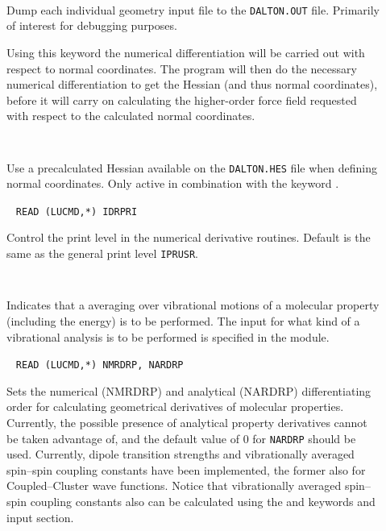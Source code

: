 \begin{description}
\item[]\verb| |\newline

Dump each individual geometry input file to the \verb|DALTON.OUT|
file. Primarily of interest for debugging purposes.

\item[]
Using this keyword the numerical differentiation will be carried out
with respect to normal coordinates. The program will then do the
necessary numerical differentiation to get the Hessian (and thus
normal coordinates), before it will carry on calculating the
higher-order force field requested with respect to the calculated normal
coordinates.

\item[]\verb| |\newline

Use a precalculated Hessian available on the \verb|DALTON.HES| file
when defining normal coordinates. Only active in combination with the
keyword .

\item[]\verb| |\newline
\verb|READ (LUCMD,*) IDRPRI|

Control the print level in the numerical derivative routines. Default
is the same as the general print level \verb|IPRUSR|.

\item[]\verb| |\newline

Indicates that a averaging over vibrational motions of a molecular
property (including the energy) is to be performed. The input
for what kind of a vibrational analysis is to be performed is
specified in the  module.

\item[]\verb| |\newline
\verb|READ (LUCMD,*) NMRDRP, NARDRP|

Sets the numerical (NMRDRP) and analytical (NARDRP) differentiating
order for calculating geometrical derivatives of molecular
properties. Currently, the possible presence of analytical property
derivatives cannot be taken advantage of, and the default value of $0$
for \verb|NARDRP| should be used. Currently, dipole transition
strengths and vibrationally averaged spin--spin coupling constants
have been implemented, the former also for Coupled--Cluster wave
functions. Notice that vibrationally
averaged spin--spin coupling constants also can be calculated using
the  and  keywords and input section.


\end{description}
